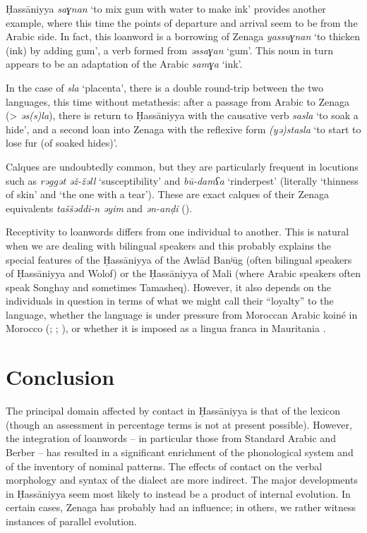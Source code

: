 \documentclass[output=paper]{langsci/langscibook}
\begin{document}
Ḥassāniyya \textit{saɣnan} ‘to mix gum with water to make ink’ provides another example, where this time the points of departure and arrival seem to be from the Arabic side. In fact, this loanword is a borrowing of Zenaga \textit{yassuɣnan} ‘to thicken (ink) by adding gum’, a verb formed from \textit{əssaɣan} ‘gum’. This noun in turn appears to be an adaptation of the Arabic \textit{samɣa} ‘ink’. 

In the case of \textit{sla} ‘placenta’, there is a double round-trip between the two languages, this time without metathesis: after a passage from Arabic to Zenaga (> \textit{əs(s)la}), there is return to Ḥassāniyya with the causative verb \textit{sasla} ‘to soak a hide’, and a second loan into Zenaga with the reflexive form \textit{(yə)stasla} ‘to start to lose fur (of soaked hides)’.


Calques are undoubtedly common, but they are particularly frequent in locutions such as \textit{rəggət} \textit{əž-žəll} ‘susceptibility’ and \textit{bū-damʕa} ‘rinderpest’ (literally ‘thinness of skin’ and ‘the one with a tear’). These are exact calques of their Zenaga equivalents \textit{taššəddi-n} \textit{əyim} and \textit{ən-anḍi} (\citealt{Taine-Cheikh2008chapter}).


Receptivity to loanwords differs from one individual to another. This is natural when we are dealing with bilingual speakers and this probably explains the special features of the Ḥassāniyya of the Awlād Banʲūg (often bilingual speakers of Ḥassāniyya and Wolof) or the Ḥassāniyya of Mali (where Arabic speakers often speak Songhay and sometimes Tamasheq). However, it also depends on the individuals in question in terms of what we might call their “loyalty” to the language, whether the language is under pressure from Moroccan Arabic koiné in Morocco (\citealt{Taine-Cheikh1997socio}; \citealt{Heath2002}; \citealt{Paciotti2017}), or whether it is imposed as a lingua franca in Mauritania \citep{Dia2007}.

\section{ Conclusion} %

The principal domain affected by contact in Ḥassāniyya is that of the lexicon (though an assessment in percentage terms is not at present possible). However, the integration of loanwords – in particular those from Standard Arabic and Berber – has resulted in a significant enrichment of the phonological system and of the inventory of nominal patterns. The effects of contact on the verbal morphology and syntax of the dialect are more indirect. The major developments in Ḥassāniyya seem most likely to instead be a product of internal evolution. In certain cases, Zenaga has probably had an influence; in others, we rather witness instances of parallel evolution. 
\end{document}
